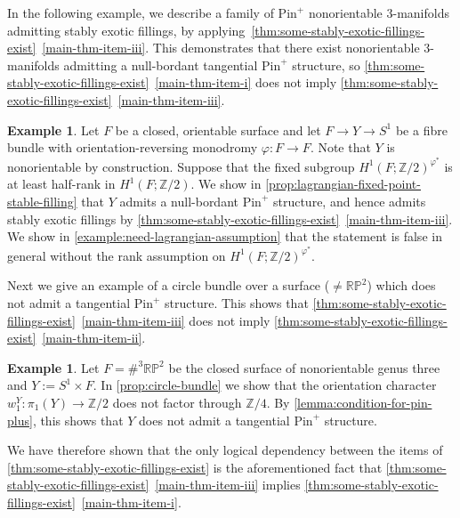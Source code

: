 \documentclass[a4paper, reqno]{amsart}
\theoremstyle{definition}
\newtheorem{example}[proposition]{Example}
\theoremstyle{remark}
\newcommand{\Z}{\mathbb{Z}}
\newcommand{\pinplus}{{\mathrm{Pin}^+}\!}
\newcommand{\RP}{\mathbb{RP}}
\begin{document}
In the following example, we describe a family of $\pinplus$ nonorientable $3$-manifolds admitting stably exotic fillings, by applying~\cref{thm:some-stably-exotic-fillings-exist}~\eqref{main-thm-item-iii}. This demonstrates 
that there exist nonorientable 3-manifolds admitting a null-bordant tangential $\pinplus$ structure, so \cref{thm:some-stably-exotic-fillings-exist}~\eqref{main-thm-item-i} does not imply \cref{thm:some-stably-exotic-fillings-exist}~\eqref{main-thm-item-iii}.

\begin{example}\label{example:orientation-reversing-monodromy}
    Let $F$ be a closed, orientable surface and let $F \to Y \to S^1$ be a fibre bundle with orientation-reversing monodromy $\varphi \colon F \to F$. Note that $Y$ is nonorientable by construction. Suppose that the fixed subgroup $H^1(F;\Z/2)^{\varphi^*}$ is at least half-rank in $H^1(F;\Z/2)$. 
    We show in \cref{prop:lagrangian-fixed-point-stable-filling} that $Y$ admits a null-bordant $\pinplus$ structure, and hence admits stably exotic fillings by \cref{thm:some-stably-exotic-fillings-exist}~\eqref{main-thm-item-iii}. 
    We show in \cref{example:need-lagrangian-assumption} that the statement is false in general without the rank assumption on  $H^1(F;\Z/2)^{\varphi^*}$.
\end{example}

Next we give an example of a circle bundle over a surface ($\neq \RP^2$) which does not admit a tangential $\pinplus$ structure. This shows that 
 \cref{thm:some-stably-exotic-fillings-exist}~\eqref{main-thm-item-iii} does not imply \cref{thm:some-stably-exotic-fillings-exist}~\eqref{main-thm-item-ii}.
 
\begin{example}\label{example-intro-circle-bundle}
Let $F= \#^3 \RP^2$ be the closed surface of nonorientable genus three and $Y := S^1 \times F$.  In \cref{prop:circle-bundle} we show that the orientation character $w_1^Y\colon \pi_1(Y)\to\Z/2$ does not factor through $\Z/4$. 
By \cref{lemma:condition-for-pin-plus}, this shows that $Y$ does not admit a tangential $\pinplus$ structure.
\end{example}

We have therefore shown that the only logical dependency between the items of \cref{thm:some-stably-exotic-fillings-exist} is the aforementioned fact that \cref{thm:some-stably-exotic-fillings-exist}~\eqref{main-thm-item-iii} implies \cref{thm:some-stably-exotic-fillings-exist}~\eqref{main-thm-item-i}.
\end{document}
